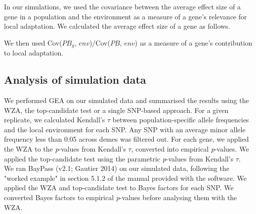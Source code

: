 \documentclass[10pt,twoside,lineno, twocolumn]{GSA_format}
\begin{document}


In our simulations, we used the covariance between the average effect size of a gene in a population and the environment as a measure of a gene's relevance for local adaptation. We calculated the average effect size of a gene as follows.

We then used Cov($PB_g$, $env$)/Cov($PB$, $env$) as a measure of a gene's contribution to local adaptation.


\subsection{Analysis of simulation data}

We performed GEA on our simulated data and summarised the results using the WZA, the top-candidate test or a single SNP-based approach. For a given replicate, we calculated Kendall's $\tau$ between population-specific allele frequencies and the local environment for each SNP. Any SNP with an average minor allele frequency less than 0.05 across demes was filtered out. For each gene, we applied the WZA to the \textit{p}-values from Kendall's $\tau$, converted into empirical \textit{p}-values. We applied the top-candidate test using the parametric \textit{p}-values from Kendall's $\tau$. \\

We ran BayPass (v2.1; Gautier 2014) on our simulated data, following the "worked example" in section 5.1.2 of the manual provided with the software. We applied the WZA and top-candidate test to Bayes factors for each SNP. We converted Bayes factors to empirical \textit{p}-values before analysing them with the WZA. \\
\end{document}
